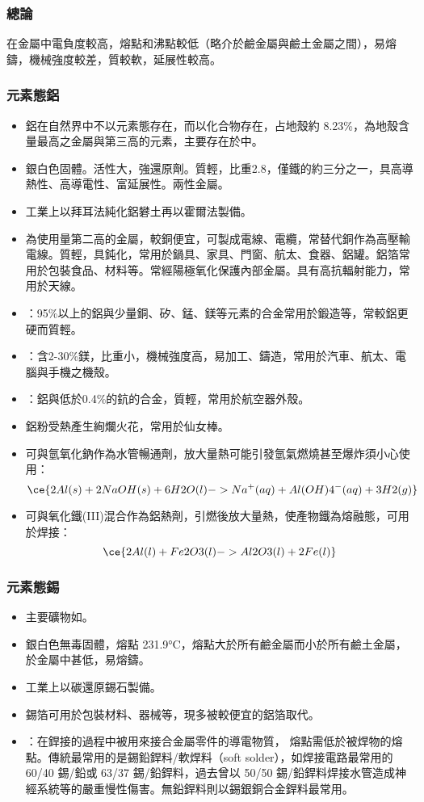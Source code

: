 \documentclass[a4paper,12pt]{report}
\begin{document}
\begin{itemize}
\begin{itemize}
\subsubsection{總論}
在金屬中電負度較高，熔點和沸點較低（略介於鹼金屬與鹼土金屬之間），易熔鑄，機械強度較差，質較軟，延展性較高。
\subsubsection{元素態鋁}
\begin{itemize}
\item 鋁在自然界中不以元素態存在，而以化合物存在，占地殼約 8.23\%，為地殼含量最高之金屬與第三高的元素，主要存在於中。
\item 銀白色固體。活性大，強還原劑。質輕，比重2.8，僅鐵的約三分之一，具高導熱性、高導電性、富延展性。兩性金屬。
\item 工業上以拜耳法純化鋁礬土再以霍爾法製備。
\item 為使用量第二高的金屬，較銅便宜，可製成電線、電纜，常替代銅作為高壓輸電線。質輕，具鈍化，常用於鍋具、家具、門窗、航太、食器、鋁罐。鋁箔常用於包裝食品、材料等。常經陽極氧化保護內部金屬。具有高抗輻射能力，常用於天線。
\item {}：95\%以上的鋁與少量銅、矽、錳、鎂等元素的合金常用於鍛造等，常較鋁更硬而質輕。
\item {}：含2-30\%鎂，比重小，機械強度高，易加工、鑄造，常用於汽車、航太、電腦與手機之機殼。
\item {}：鋁與低於0.4\%的鈧的合金，質輕，常用於航空器外殼。
\item 鋁粉受熱產生絢爛火花，常用於仙女棒。
\item 可與氫氧化鈉作為水管暢通劑，放大量熱可能引發氫氣燃燒甚至爆炸須小心使用：
\[\ce{2Al(s) + 2NaOH(s) + 6H2O(l) -> Na^+(aq) + Al(OH)4^-(aq) + 3H2(g)}\]
\item 可與氧化鐵(III)混合作為鋁熱劑，引燃後放大量熱，使產物鐵為熔融態，可用於焊接：
\[\ce{2Al(l) + Fe2O3(l) -> Al2O3(l) + 2Fe(l)}\]
\end{itemize}
\subsubsection{元素態錫}
\begin{itemize}
\item 主要礦物如。
\item 銀白色無毒固體，熔點 231.9°C，熔點大於所有鹼金屬而小於所有鹼土金屬，於金屬中甚低，易熔鑄。
\item 工業上以碳還原錫石製備。
\item 錫箔可用於包裝材料、器械等，現多被較便宜的鋁箔取代。
\item {}：在銲接的過程中被用來接合金屬零件的導電物質， 熔點需低於被焊物的熔點。傳統最常用的是錫鉛銲料/軟焊料（soft solder），如焊接電路最常用的 60/40 錫/鉛或 63/37 錫/鉛銲料，過去曾以 50/50 錫/鉛銲料焊接水管造成神經系統等的嚴重慢性傷害。無鉛銲料則以錫銀銅合金銲料最常用。
\end{itemize}

\end{itemize}
\end{itemize}
\end{document}
